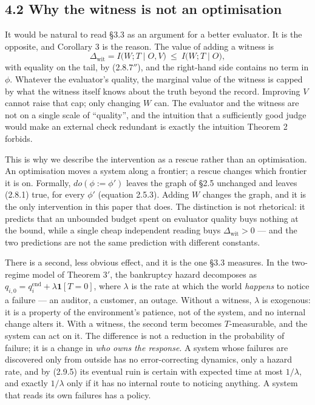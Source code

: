 \documentclass[11pt,a4paper]{article}
\begin{document}
\subsection{4.2 Why the witness is not an optimisation}\label{why-the-witness-is-not-an-optimisation}

It would be natural to read §3.3 as an argument for a better evaluator. It is the
opposite, and Corollary 3 is the reason. The value of adding a witness is
\begin{equation}
\Delta_{\mathrm{wit}}=I\big(W;T\mid O,V\big)\ \le\ I\big(W;T\mid O\big),
\tag{4.2.1}
\end{equation}
with equality on the tail, by (2.8.7\(''\)), and the right-hand side contains no term
in \(\phi\). Whatever the evaluator's
quality, the marginal value of the witness is capped by what the witness itself
knows about the truth beyond the record. Improving \(V\) cannot raise that cap;
only changing \(W\) can. The evaluator and the witness are not on a single scale of
``quality'', and the intuition that a sufficiently good judge would make an external
check redundant is exactly the intuition Theorem 2 forbids.

This is why we describe the intervention as a rescue rather than an optimisation.
An optimisation moves a system along a frontier; a rescue changes which frontier
it is on. Formally, \(do(\phi:=\phi')\) leaves the graph of §2.5 unchanged and
leaves (2.8.1) true, for every \(\phi'\) (equation 2.5.3). Adding \(W\) changes the
graph, and it is the only intervention in this paper that does. The distinction is
not rhetorical: it predicts that an unbounded budget spent on evaluator quality
buys nothing at the bound, while a single cheap independent reading buys
\(\Delta_{\mathrm{wit}}>0\) --- and the two predictions are not the same prediction
with different constants.

There is a second, less obvious effect, and it is the one §3.3 measures. In the
two-regime model of Theorem 3\('\), the bankruptcy hazard decomposes as
\(q_{i,0}=q^{\mathrm{end}}_{i}+\lambda\mathbf 1[T=0]\), where \(\lambda\) is the rate
at which the world \emph{happens} to notice a failure --- an auditor, a customer, an
outage. Without a witness, \(\lambda\) is exogenous: it is a property of the
environment's patience, not of the system, and no internal change alters it. With
a witness, the second term becomes \(T\)-measurable, and the system can act on it.
The difference is not a reduction in the probability of failure; it is a change in
\emph{who owns the response}. A system whose failures are discovered only from outside
has no error-correcting dynamics, only a hazard rate, and by (2.9.5) its eventual
ruin is certain with expected time at most \(1/\lambda\), and exactly \(1/\lambda\)
only if it has no internal route to noticing anything. A system that reads its own
failures has a policy.
\end{document}
